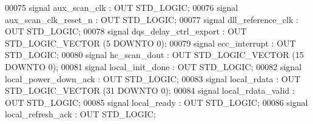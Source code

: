 \begin{DoxyCode}
00075                  \textcolor{keywordflow}{signal} \textcolor{vhdlchar}{aux_scan_clk} \textcolor{vhdlchar}{:} \textcolor{keywordflow}{OUT} \textcolor{comment}{STD\_LOGIC};
00076                  \textcolor{keywordflow}{signal} \textcolor{vhdlchar}{aux_scan_clk_reset_n} \textcolor{vhdlchar}{:} \textcolor{keywordflow}{OUT} \textcolor{comment}{STD\_LOGIC};
00077                  \textcolor{keywordflow}{signal} \textcolor{vhdlchar}{dll_reference_clk} \textcolor{vhdlchar}{:} \textcolor{keywordflow}{OUT} \textcolor{comment}{STD\_LOGIC};
00078                  \textcolor{keywordflow}{signal} \textcolor{vhdlchar}{dqs_delay_ctrl_export} \textcolor{vhdlchar}{:} \textcolor{keywordflow}{OUT} \textcolor{comment}{STD\_LOGIC\_VECTOR} \textcolor{vhdlchar}{(}\textcolor{vhdllogic}{}\textcolor{vhdllogic}{5} \textcolor{keywordflow}{DOWNTO} \textcolor{vhdllogic}{}\textcolor{vhdllogic}{0}\textcolor{vhdlchar}{)};
00079                  \textcolor{keywordflow}{signal} \textcolor{vhdlchar}{ecc_interrupt} \textcolor{vhdlchar}{:} \textcolor{keywordflow}{OUT} \textcolor{comment}{STD\_LOGIC};
00080                  \textcolor{keywordflow}{signal} \textcolor{vhdlchar}{hc_scan_dout} \textcolor{vhdlchar}{:} \textcolor{keywordflow}{OUT} \textcolor{comment}{STD\_LOGIC\_VECTOR} \textcolor{vhdlchar}{(}\textcolor{vhdllogic}{}\textcolor{vhdllogic}{15} \textcolor{keywordflow}{DOWNTO} \textcolor{vhdllogic}{}\textcolor{vhdllogic}{0}\textcolor{vhdlchar}{)};
00081                  \textcolor{keywordflow}{signal} \textcolor{vhdlchar}{local_init_done} \textcolor{vhdlchar}{:} \textcolor{keywordflow}{OUT} \textcolor{comment}{STD\_LOGIC};
00082                  \textcolor{keywordflow}{signal} \textcolor{vhdlchar}{local_power_down_ack} \textcolor{vhdlchar}{:} \textcolor{keywordflow}{OUT} \textcolor{comment}{STD\_LOGIC};
00083                  \textcolor{keywordflow}{signal} \textcolor{vhdlchar}{local_rdata} \textcolor{vhdlchar}{:} \textcolor{keywordflow}{OUT} \textcolor{comment}{STD\_LOGIC\_VECTOR} \textcolor{vhdlchar}{(}\textcolor{vhdllogic}{}\textcolor{vhdllogic}{31} \textcolor{keywordflow}{DOWNTO} \textcolor{vhdllogic}{}\textcolor{vhdllogic}{0}\textcolor{vhdlchar}{)};
00084                  \textcolor{keywordflow}{signal} \textcolor{vhdlchar}{local_rdata_valid} \textcolor{vhdlchar}{:} \textcolor{keywordflow}{OUT} \textcolor{comment}{STD\_LOGIC};
00085                  \textcolor{keywordflow}{signal} \textcolor{vhdlchar}{local_ready} \textcolor{vhdlchar}{:} \textcolor{keywordflow}{OUT} \textcolor{comment}{STD\_LOGIC};
00086                  \textcolor{keywordflow}{signal} \textcolor{vhdlchar}{local_refresh_ack} \textcolor{vhdlchar}{:} \textcolor{keywordflow}{OUT} \textcolor{comment}{STD\_LOGIC};

\end{DoxyCode}

